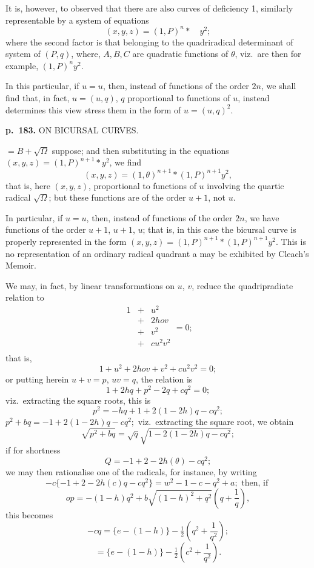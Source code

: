 \documentclass[11pt,a4paper]{book}
\begin{document}
It is, however, to observed that there are also curves of deficiency 1, similarly representable by a system of equations
\[
(x, y, z) = (1, P)^n \ast \quad y^2;
\]
where the second factor is that belonging to the quadriradical determinant of system of $(P, q)$, where, $A, B, C$ are quadratic functions of $\theta$, viz.\ are then for example, $(1, P)^n y^2$.

In this particular, if $u = u$, then, instead of functions of the order $2n$, we shall find that, in fact, $u = (u, q)$, $q$ proportional to functions of $u$, instead determines this view stress them in the form of $u = (u, q)^2$.

\clearpage

\noindent
\textbf{p.~183.}  ON BICURSAL CURVES.

$= B + \sqrt{\Omega}$ suppose; and then substituting in the equations $(x, y, z) = (1, P)^{n+1} \ast y^2$, we find
\[
(x, y, z) = (1, \theta)^{n+1} \ast (1, P)^{n+1} y^2,
\]
that is, here $(x, y, z)$, proportional to functions of $u$ involving the quartic radical $\sqrt{\Omega}$;
but these functions are of the order $u + 1$, not $u$.

In particular, if $u = u$, then, instead of functions of the order $2n$, we have functions of the order $u + 1$, $u + 1$, $u$; that is, in this case the bicursal curve is properly represented in the form $(x, y, z) = (1, P)^{n+1} \ast (1, P)^{n+1} y^2$.  This is no representation of an ordinary radical quadrant a may be exhibited by Cleach's Memoir.

We may, in fact, by linear transformations on $u$, $v$, reduce the quadripradiate relation to
\[
\begin{matrix}
1 & + & u^2 \\
& + & 2 hov \\
& + & v^2 \\
& + & c u^2 v^2 \\
\end{matrix} = 0;
\]
that is,
\[
1 + u^2 + 2hov + v^2 + c u^2 v^2 = 0;
\]
or putting herein $u + v = p$, $uv = q$, the relation is
\[
1 + 2hq + p^2 - 2q + c q^2 = 0;
\]
viz.\ extracting the square roots, this is
\[
p^2 = -hq + 1 + 2(1 - 2h)q - cq^2;
\]
$p^2 + bq = -1 + 2(1 - 2h)q - cq^2;$
viz.\ extracting the square root, we obtain
\[
\sqrt{p^2 + bq} = \sqrt{q}\sqrt{1 - 2(1 - 2h)q - cq^2};
\]
if for shortness
\[
Q = -1 + 2 -2h(\theta) - cq^2;
\]
we may then rationalise one of the radicals, for instance, by writing
\[
-c \{-1 + 2 - 2h(c)q - cq^2\} = w^2 - 1 - c - q^2 + a; \text{ then, if }
\]
\[
op = -(1 - h)q^2 + b \sqrt{(1 - h)^2 + q^2}\left( q + \frac{1}{q} \right),
\]
this becomes
\[
-cq = \{e - (1 - h)\} - \tfrac{1}{2}\left(q^2 + \frac{1}{q^2}\right);
\]
\[
= \{e - (1 - h)\} - \tfrac{1}{2}\left(c^2 + \frac{1}{q^2}\right).
\]
\end{document}
